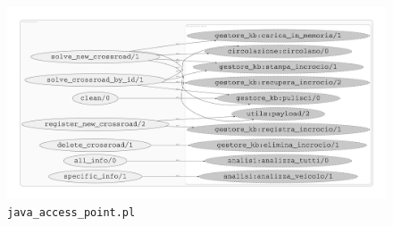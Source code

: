 \begin{figure}
	\includegraphics[width=\textwidth, height=\textheight, keepaspectratio]{diagrams/java_access_point}
	\caption{\texttt{java\_access\_point.pl}}
\end{figure}

